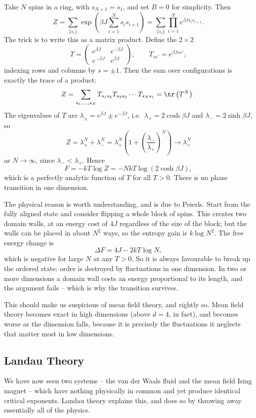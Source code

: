 \documentclass[a4paper]{scrartcl}
\begin{document}
Take $N$ spins in a ring, with $s_{N+1} = s_1$, and set $B = 0$ for simplicity. Then
$$
Z = \sum_{\{s_i\}}\exp\left(\beta J \sum_{i=1}^N s_i s_{i+1}\right) = \sum_{\{s_i\}}\prod_{i=1}^N e^{\beta J s_i s_{i+1}}.
$$
The trick is to write this as a matrix product. Define the $2\times 2$ 
$$
T = \begin{pmatrix} e^{\beta J} & e^{-\beta J}\\ e^{-\beta J} & e^{\beta J}\end{pmatrix}, \qquad T_{s s'} = e^{\beta J s s'},
$$
indexing rows and columns by $s = \pm 1$. Then the sum over configurations is exactly the trace of a product:
$$
Z = \sum_{s_1,\dots,s_N}T_{s_1s_2}T_{s_2s_3}\cdots T_{s_Ns_1} = \tr\left(T^N\right).
$$
The eigenvalues of $T$ are $\lambda_\pm = e^{\beta J}\pm e^{-\beta J}$, i.e.\ $\lambda_+ = 2\cosh\beta J$ and $\lambda_- = 2\sinh\beta J$, so
$$
Z = \lambda_+^N + \lambda_-^N = \lambda_+^N\left(1 + \left(\frac{\lambda_-}{\lambda_+}\right)^N\right) \to \lambda_+^N
$$
as $N \to \infty$, since $\lambda_- < \lambda_+$. Hence
$$
F = -kT\log Z = -NkT\log(2\cosh\beta J),
$$
which is a perfectly analytic function of $T$ for all $T > 0$. There is no phase transition in one dimension.

The physical reason is worth understanding, and is due to Peierls. Start from the fully aligned state and consider flipping a whole block of spins. This creates two domain walls, at an energy cost of $4J$ regardless of the size of the block; but the walls can be placed in about $N^2$ ways, so the entropy gain is $k\log N^2$. The free energy change is
$$
\Delta F = 4J - 2kT\log N,
$$
which is negative for large $N$ at any $T > 0$. So it is always favourable to break up the ordered state: order is destroyed by fluctuations in one dimension. In two or more dimensions a domain wall costs an energy proportional to its length, and the argument fails -- which is why the transition survives.

This should make us suspicious of mean field theory, and rightly so. Mean field theory becomes exact in high dimensions (above $d = 4$, in fact), and becomes worse as the dimension falls, because it is precisely the fluctuations it neglects that matter most in low dimensions.

\subsection{Landau Theory}

We have now seen two systems -- the van der Waals fluid and the mean field Ising magnet -- which have nothing physically in common and yet produce identical critical exponents. Landau theory explains this, and does so by throwing away essentially all of the physics.
\end{document}
